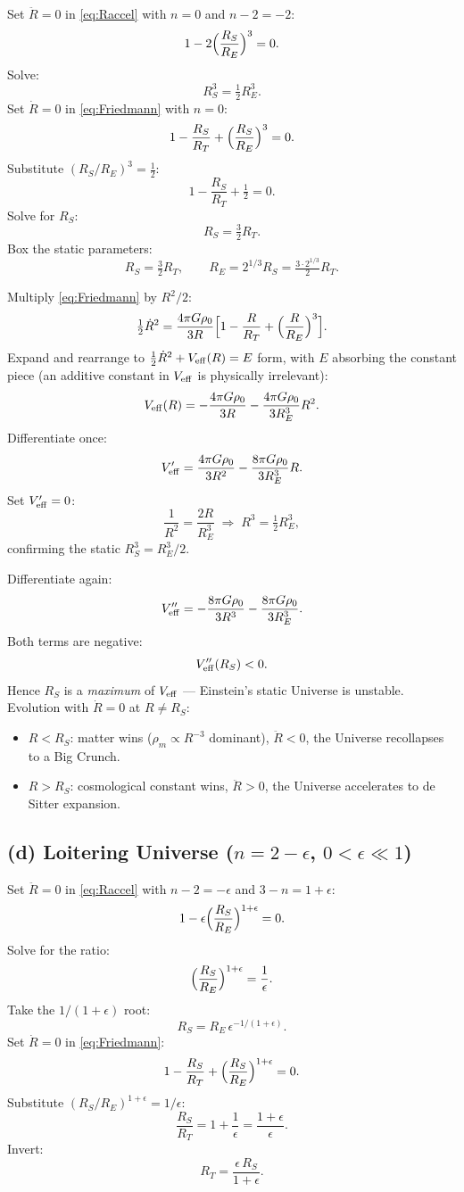 \documentclass[11pt]{article}
\begin{document}
Set $\ddot R=0$ in \eqref{eq:Raccel} with $n=0$ and $n-2=-2$:
\[
1-2\Bigl(\frac{R_{S}}{R_{E}}\Bigr)^{3}=0.
\]
Solve:
\[
R_{S}^{3}=\tfrac{1}{2}R_{E}^{3}.
\]
Set $\dot R=0$ in \eqref{eq:Friedmann} with $n=0$:
\[
1-\frac{R_{S}}{R_{T}}+\Bigl(\frac{R_{S}}{R_{E}}\Bigr)^{3}=0.
\]
Substitute $(R_{S}/R_{E})^{3}=\tfrac{1}{2}$:
\[
1-\frac{R_{S}}{R_{T}}+\tfrac{1}{2}=0.
\]
Solve for $R_{S}$:
\[
R_{S}=\tfrac{3}{2}R_{T}.
\]
Box the static parameters:
\[
\boxed{\;R_{S}=\tfrac{3}{2}R_{T},\qquad R_{E}=2^{1/3}R_{S}=\tfrac{3\cdot 2^{1/3}}{2}R_{T}.\;}
\]

Multiply \eqref{eq:Friedmann} by $R^{2}/2$:
\[
\tfrac{1}{2}\dot R^{2}=\frac{4\pi G\rho_{0}}{3R}\Bigl[1-\frac{R}{R_{T}}+\Bigl(\frac{R}{R_{E}}\Bigr)^{3}\Bigr].
\]
Expand and rearrange to $\tfrac{1}{2}\dot R^{2}+V_{\rm eff}(R)=E$ form, with $E$ absorbing the constant piece (an additive constant in $V_{\rm eff}$ is physically irrelevant):
\[
V_{\rm eff}(R)=-\frac{4\pi G\rho_{0}}{3R}-\frac{4\pi G\rho_{0}}{3R_{E}^{3}}R^{2}.
\]
Differentiate once:
\[
V'_{\rm eff}=\frac{4\pi G\rho_{0}}{3R^{2}}-\frac{8\pi G\rho_{0}}{3R_{E}^{3}}R.
\]
Set $V'_{\rm eff}=0$:
\[
\frac{1}{R^{2}}=\frac{2R}{R_{E}^{3}}\;\Rightarrow\; R^{3}=\tfrac{1}{2}R_{E}^{3},
\]
confirming the static $R_{S}^{3}=R_{E}^{3}/2$.

Differentiate again:
\[
V''_{\rm eff}=-\frac{8\pi G\rho_{0}}{3R^{3}}-\frac{8\pi G\rho_{0}}{3R_{E}^{3}}.
\]
Both terms are negative:
\[
V''_{\rm eff}(R_{S})<0.
\]
Hence $R_{S}$ is a \emph{maximum} of $V_{\rm eff}$ — Einstein's static Universe is unstable.  Evolution with $\dot R=0$ at $R\neq R_{S}$:
\begin{itemize}
\item $R<R_{S}$: matter wins ($\rho_{m}\propto R^{-3}$ dominant), $\ddot R<0$, the Universe recollapses to a Big Crunch.
\item $R>R_{S}$: cosmological constant wins, $\ddot R>0$, the Universe accelerates to de Sitter expansion.
\end{itemize}

\subsection*{(d) Loitering Universe ($n=2-\epsilon$, $0<\epsilon\ll 1$)}

Set $\ddot R=0$ in \eqref{eq:Raccel} with $n-2=-\epsilon$ and $3-n=1+\epsilon$:
\[
1-\epsilon\Bigl(\frac{R_{S}}{R_{E}}\Bigr)^{1+\epsilon}=0.
\]
Solve for the ratio:
\[
\Bigl(\frac{R_{S}}{R_{E}}\Bigr)^{1+\epsilon}=\frac{1}{\epsilon}.
\]
Take the $1/(1+\epsilon)$ root:
\begin{equation}
\boxed{\;R_{S}=R_{E}\,\epsilon^{-1/(1+\epsilon)}.\;}
\end{equation}
Set $\dot R=0$ in \eqref{eq:Friedmann}:
\[
1-\frac{R_{S}}{R_{T}}+\Bigl(\frac{R_{S}}{R_{E}}\Bigr)^{1+\epsilon}=0.
\]
Substitute $(R_{S}/R_{E})^{1+\epsilon}=1/\epsilon$:
\[
\frac{R_{S}}{R_{T}}=1+\frac{1}{\epsilon}=\frac{1+\epsilon}{\epsilon}.
\]
Invert:
\[
R_{T}=\frac{\epsilon\,R_{S}}{1+\epsilon}.
\]
\end{document}

